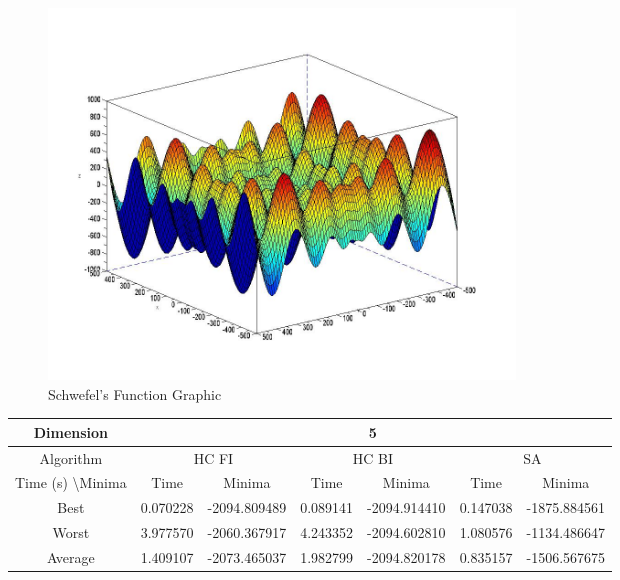 \documentclass{article}
\newcommand{\mediumSpace}{\vspace{0.5cm}}
\begin{document}
\begin{figure}[h!]
  \includegraphics[width=0.6\textwidth]{schwefelsfunction.jpg}
  \caption{Schwefel's Function Graphic\cite{jamesmccaffrey}}
\end{figure}
 
 \mediumSpace
 
 \begin{table}[H]
\begin{tabular}{|c|c|c|c|c|c|c|}
\hline
Dimension                      & \multicolumn{6}{c|}{5}                                                            \\ \hline
Algorithm                      & \multicolumn{2}{c|}{HC FI} & \multicolumn{2}{c|}{HC BI} & \multicolumn{2}{c|}{SA} \\ \hline
Time (s) \textbackslash Minima & Time       & Minima        & Time       & Minima        & Time     & Minima       \\ \hline
Best                           & 0.070228   & -2094.809489  & 0.089141   & -2094.914410  & 0.147038 & -1875.884561 \\ \hline
Worst                          & 3.977570   & -2060.367917  & 4.243352   & -2094.602810  & 1.080576 & -1134.486647 \\ \hline
Average                        & 1.409107   & -2073.465037  & 1.982799   & -2094.820178  & 0.835157 & -1506.567675 \\ \hline
\end{tabular}
\end{table}
 
\end{document}
